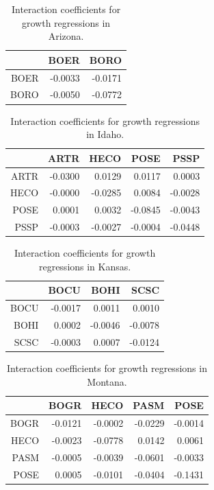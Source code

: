 \documentclass[12pt,]{article}
\begin{document}
\begin{table}[ht]
\centering
\caption{Interaction coefficients for growth regressions in Arizona.} 
\begin{tabular}{rrr}
  \hline
 & BOER & BORO \\ 
  \hline
BOER & -0.0033 & -0.0171 \\ 
  BORO & -0.0050 & -0.0772 \\ 
   \hline
\end{tabular}
\end{table}\begin{table}[ht]
\centering
\caption{Interaction coefficients for growth regressions in Idaho.} 
\begin{tabular}{rrrrr}
  \hline
 & ARTR & HECO & POSE & PSSP \\ 
  \hline
ARTR & -0.0300 & 0.0129 & 0.0117 & 0.0003 \\ 
  HECO & -0.0000 & -0.0285 & 0.0084 & -0.0028 \\ 
  POSE & 0.0001 & 0.0032 & -0.0845 & -0.0043 \\ 
  PSSP & -0.0003 & -0.0027 & -0.0004 & -0.0448 \\ 
   \hline
\end{tabular}
\end{table}\begin{table}[ht]
\centering
\caption{Interaction coefficients for growth regressions in Kansas.} 
\begin{tabular}{rrrr}
  \hline
 & BOCU & BOHI & SCSC \\ 
  \hline
BOCU & -0.0017 & 0.0011 & 0.0010 \\ 
  BOHI & 0.0002 & -0.0046 & -0.0078 \\ 
  SCSC & -0.0003 & 0.0007 & -0.0124 \\ 
   \hline
\end{tabular}
\end{table}\begin{table}[ht]
\centering
\caption{Interaction coefficients for growth regressions in Montana.} 
\begin{tabular}{rrrrr}
  \hline
 & BOGR & HECO & PASM & POSE \\ 
  \hline
BOGR & -0.0121 & -0.0002 & -0.0229 & -0.0014 \\ 
  HECO & -0.0023 & -0.0778 & 0.0142 & 0.0061 \\ 
  PASM & -0.0005 & -0.0039 & -0.0601 & -0.0033 \\ 
  POSE & 0.0005 & -0.0101 & -0.0404 & -0.1431 \\ 
   \hline
\end{tabular}

\end{table}
\end{document}
